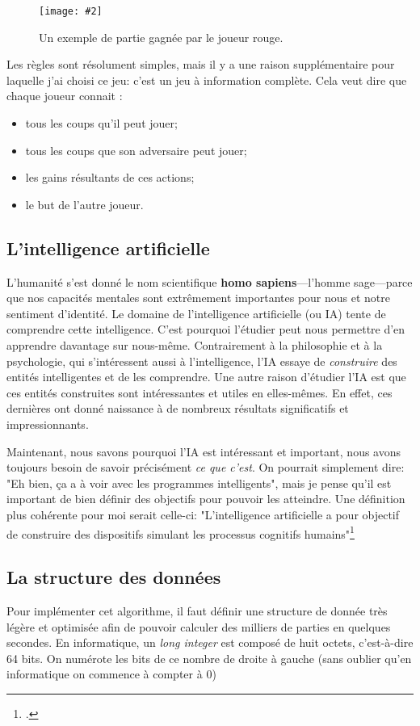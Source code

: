 \documentclass[a4paper]{article}
\newcommand{\img}[3][]{
    \begin{figure}[H]
        \centering
        \texttt{[image: \#2]}
        \caption{#1}    
    \end{figure}
}
\begin{document}
    \img[Un exemple de partie gagnée par le joueur rouge.]{Images/puissance4.jpg}{0.5}

    Les règles sont résolument simples, mais il y a une raison supplémentaire pour laquelle j'ai choisi ce jeu: c'est un jeu à information complète. Cela veut dire que chaque joueur connait : \begin{itemize}
        \item tous les coups qu'il peut jouer;
        \item tous les coups que son adversaire peut jouer;
        \item les gains résultants de ces actions;
        \item le but de l'autre joueur.
    \end{itemize}

\subsection{L'intelligence artificielle}
    L'humanité s'est donné le nom scientifique \textbf{homo sapiens}---l'homme sage---parce que nos capacités mentales sont extrêmement importantes pour nous et notre sentiment d'identité. Le domaine de l'intelligence artificielle (ou IA) tente de comprendre cette intelligence. C'est pourquoi l'étudier peut nous permettre d'en apprendre davantage sur nous-même. Contrairement à la philosophie et à la psychologie, qui s'intéressent aussi à l'intelligence, l'IA essaye de \textit{construire} des entités intelligentes et de les comprendre. Une autre raison d'étudier l'IA est que ces entités construites sont intéressantes et utiles en elles-mêmes. En effet, ces dernières ont donné naissance à de nombreux résultats significatifs et impressionnants.

    Maintenant, nous savons pourquoi l'IA est intéressant et important, nous avons toujours besoin de savoir précisément \textit{ce que c'est}. On pourrait simplement dire: "Eh bien, ça a à voir avec les programmes intelligents", mais je pense qu'il est important de bien définir des objectifs pour pouvoir les atteindre. Une définition plus cohérente pour moi serait celle-ci: "L’intelligence artificielle a pour objectif de construire des dispositifs simulant les processus cognitifs humains"\footcite{haiech_2020}    


\subsection{La structure des données}
    Pour implémenter cet algorithme, il faut définir une structure de donnée très légère et optimisée afin de pouvoir calculer des milliers de parties en quelques secondes. En informatique, un \textit{long integer} est composé de huit octets, c'est-à-dire 64 bits. On numérote les bits de ce nombre de droite à gauche (sans oublier qu'en informatique on commence à compter à 0)
\end{document}
